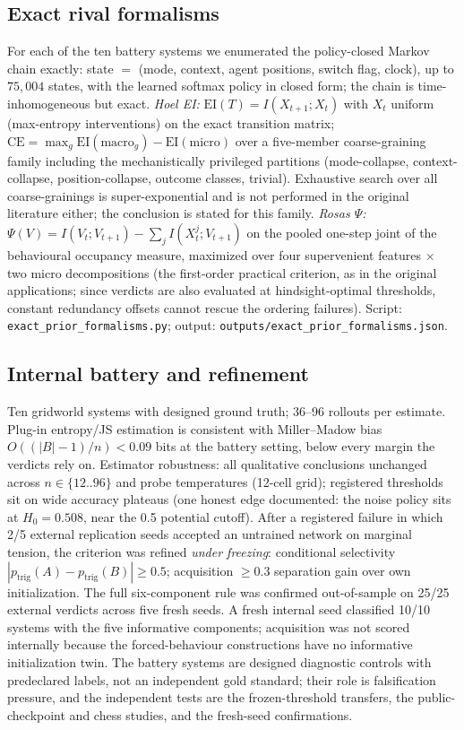 \documentclass[11pt]{article}
\theoremstyle{definition}
\newcommand{\EI}{\mathrm{EI}}
\newcommand{\CE}{\mathrm{CE}}
\begin{document}
\subsection*{Exact rival formalisms}
For each of the ten battery systems we enumerated the policy-closed
Markov chain exactly: state $=$ (mode, context, agent positions,
switch flag, clock), up to $75{,}004$ states, with the learned softmax
policy in closed form; the chain is time-inhomogeneous but exact.
\emph{Hoel EI:} $\EI(T) = I(X_{t+1}; X_t)$ with $X_t$ uniform
(max-entropy interventions) on the exact transition matrix;
$\CE = \max_g \EI(\text{macro}_g) - \EI(\text{micro})$ over a
five-member coarse-graining family including the mechanistically
privileged partitions (mode-collapse, context-collapse,
position-collapse, outcome classes, trivial). Exhaustive search over
all coarse-grainings is super-exponential and is not performed in the
original literature either; the conclusion is stated for this family.
\emph{Rosas $\Psi$:}
$\Psi(V) = I(V_t; V_{t+1}) - \sum_j I(X^j_t; V_{t+1})$ on the pooled
one-step joint of the behavioural occupancy measure, maximized over
four supervenient features $\times$ two micro decompositions (the
first-order practical criterion, as in the original applications;
since verdicts are also evaluated at hindsight-optimal thresholds,
constant redundancy offsets cannot rescue the ordering failures).
Script: \texttt{exact\_prior\_formalisms.py}; output:
\texttt{outputs/exact\_prior\_formalisms.json}.

\subsection*{Internal battery and refinement}
Ten gridworld systems with designed ground truth; 36--96 rollouts per
estimate. Plug-in entropy/JS estimation is consistent with
Miller--Madow bias $O((|B|-1)/n) < 0.09$ bits at the battery setting,
below every margin the verdicts rely on. Estimator robustness: all
qualitative conclusions unchanged across $n \in \{12..96\}$ and probe
temperatures (12-cell grid); registered thresholds sit on wide
accuracy plateaus (one honest edge documented: the noise policy sits
at $H_0 = 0.508$, near the 0.5 potential cutoff). After a registered
failure in which 2/5 external replication seeds accepted an untrained
network on marginal tension, the criterion was refined \emph{under
freezing}: conditional selectivity
$|p_{\mathrm{trig}}(A) - p_{\mathrm{trig}}(B)| \ge 0.5$; acquisition
$\ge 0.3$ separation gain over own initialization. The full
six-component rule was confirmed out-of-sample on 25/25 external
verdicts across five fresh seeds. A fresh internal seed classified
10/10 systems with the five informative components; acquisition was
not scored internally because the forced-behaviour constructions have
no informative initialization twin. The battery systems are designed
diagnostic controls with predeclared labels, not an independent gold
standard; their role is falsification pressure, and the independent
tests are the frozen-threshold transfers, the public-checkpoint and
chess studies, and the fresh-seed confirmations.
\end{document}
